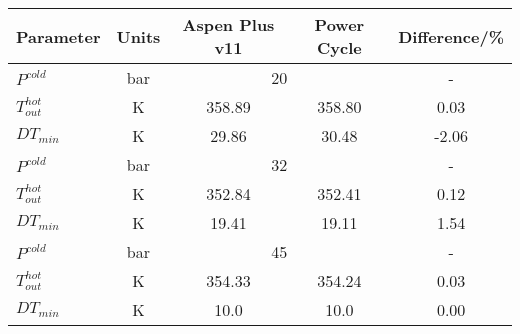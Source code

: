 \begin{tabular}{|p{2.5cm} c c c c|}
    \hline
    \rowcolor{bluepoli!40} %
    \textbf{Parameter} & \textbf{Units} & \textbf{Aspen Plus v11} & \textbf{Power Cycle} & \textbf{Difference/\unit{\percent}} \T\B \\
    \hline \hline
    \(P^{cold}\) & \unit{\bar} & \multicolumn{2}{c}{\num{20}} & - \T\B\\
    \hline
    \(T_{out}^{hot}\) & \unit{\K} & 358.89 & 358.80 & 0.03 \T\B\\
    \(DT_{min}\) & \unit{\K} & 29.86 & 30.48 & -2.06 \T\B\\
    \hline \hline
    \(P^{cold}\) & \unit{\bar} & \multicolumn{2}{c}{\num{32}} & - \T\B\\
    \hline
    \(T_{out}^{hot}\) & \unit{\K} & 352.84 & 352.41 & 0.12 \T\B\\
    \(DT_{min}\) & \unit{\K} & 19.41 & 19.11 & 1.54 \T\B\\
    \hline \hline
    \(P^{cold}\) & \unit{\bar} & \multicolumn{2}{c}{\num{45}} & - \T\B\\
    \hline
    \(T_{out}^{hot}\) & \unit{\K} & 354.33 & 354.24 & 0.03 \T\B\\
    \(DT_{min}\) & \unit{\K} & 10.0 & 10.0 & 0.00 \T\B\\
    \hline
\end{tabular}